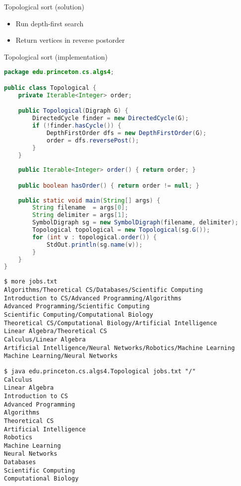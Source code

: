\documentclass[8pt,a4paper,compress]{beamer}
\begin{document}
\begin{frame}[fragile]
\pause

Topological sort (solution)
\begin{itemize}
\item Run depth-first search

\item Return vertices in reverse postorder
\end{itemize}

\pause
\bigskip

Topological sort (implementation)
\begin{lstlisting}[language=Java]
package edu.princeton.cs.algs4;

public class Topological {
    private Iterable<Integer> order; 

    public Topological(Digraph G) {
        DirectedCycle finder = new DirectedCycle(G);
        if (!finder.hasCycle()) {
            DepthFirstOrder dfs = new DepthFirstOrder(G);
            order = dfs.reversePost();
        }
    }
    
    public Iterable<Integer> order() { return order; }

    public boolean hasOrder() { return order != null; }
    
    public static void main(String[] args) {
        String filename  = args[0];
        String delimiter = args[1];
        SymbolDigraph sg = new SymbolDigraph(filename, delimiter);
        Topological topological = new Topological(sg.G());
        for (int v : topological.order()) {
            StdOut.println(sg.name(v));
        }
    }
}
\end{lstlisting}
\end{frame}

\begin{frame}[fragile]
\pause

\begin{lstlisting}[language={}]
$ more jobs.txt 
Algorithms/Theoretical CS/Databases/Scientific Computing
Introduction to CS/Advanced Programming/Algorithms
Advanced Programming/Scientific Computing
Scientific Computing/Computational Biology
Theoretical CS/Computational Biology/Artificial Intelligence
Linear Algebra/Theoretical CS
Calculus/Linear Algebra
Artificial Intelligence/Neural Networks/Robotics/Machine Learning
Machine Learning/Neural Networks
\end{lstlisting}

\pause

\begin{lstlisting}[language={}]
$ java edu.princeton.cs.algs4.Topological jobs.txt "/"
Calculus
Linear Algebra
Introduction to CS
Advanced Programming
Algorithms
Theoretical CS
Artificial Intelligence
Robotics
Machine Learning
Neural Networks
Databases
Scientific Computing
Computational Biology
\end{lstlisting}
\end{frame}
\end{document}
